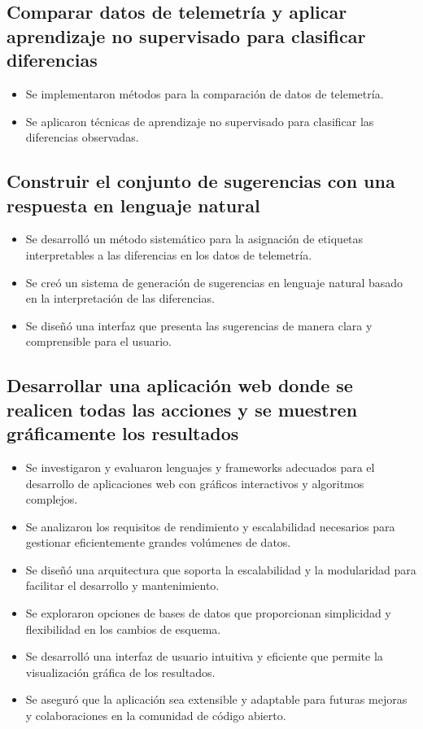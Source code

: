 \subsection{Comparar datos de telemetría y aplicar aprendizaje no supervisado para clasificar diferencias}
\begin{itemize}
    \item Se implementaron métodos para la comparación de datos de telemetría.
    \item Se aplicaron técnicas de aprendizaje no supervisado para clasificar las diferencias observadas.
\end{itemize}

\subsection{Construir el conjunto de sugerencias con una respuesta en lenguaje natural}
\begin{itemize}
    \item Se desarrolló un método sistemático para la asignación de etiquetas interpretables a las diferencias en los datos de telemetría.
    \item Se creó un sistema de generación de sugerencias en lenguaje natural basado en la interpretación de las diferencias.
    \item Se diseñó una interfaz que presenta las sugerencias de manera clara y comprensible para el usuario.
\end{itemize}

\subsection{Desarrollar una aplicación web donde se realicen todas las acciones y se muestren gráficamente los resultados}
\begin{itemize}
    \item Se investigaron y evaluaron lenguajes y frameworks adecuados para el desarrollo de aplicaciones web con gráficos interactivos y algoritmos complejos.
    \item Se analizaron los requisitos de rendimiento y escalabilidad necesarios para gestionar eficientemente grandes volúmenes de datos.
    \item Se diseñó una arquitectura que soporta la escalabilidad y la modularidad para facilitar el desarrollo y mantenimiento.
    \item Se exploraron opciones de bases de datos que proporcionan simplicidad y flexibilidad en los cambios de esquema.
    \item Se desarrolló una interfaz de usuario intuitiva y eficiente que permite la visualización gráfica de los resultados.
    \item Se aseguró que la aplicación sea extensible y adaptable para futuras mejoras y colaboraciones en la comunidad de código abierto.
\end{itemize}




